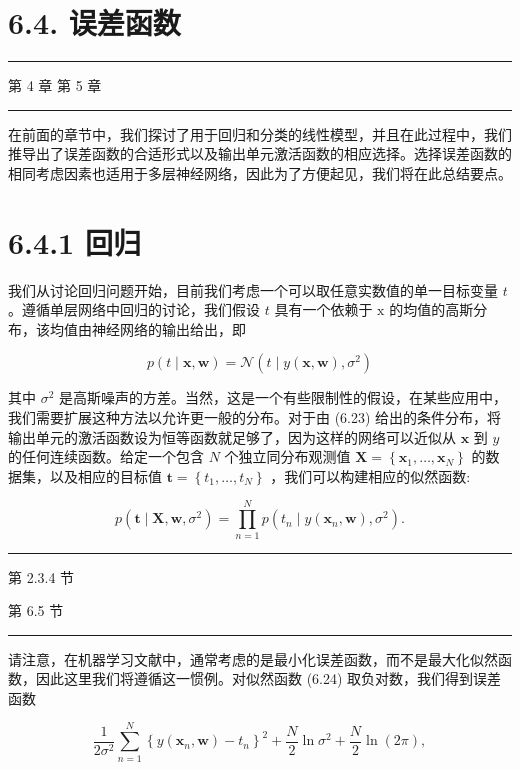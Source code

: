 \documentclass[10pt]{article}
\newcommand{\HRule}{\begin{center}\rule{0.9\linewidth}{0.2mm}\end{center}}
\begin{document}
\section*{6.4. 误差函数}

\HRule

第 4 章 第 5 章

\HRule

在前面的章节中，我们探讨了用于回归和分类的线性模型，并且在此过程中，我们推导出了误差函数的合适形式以及输出单元激活函数的相应选择。选择误差函数的相同考虑因素也适用于多层神经网络，因此为了方便起见，我们将在此总结要点。

\section*{6.4.1 回归}

我们从讨论回归问题开始，目前我们考虑一个可以取任意实数值的单一目标变量 \(t\) 。遵循单层网络中回归的讨论，我们假设 \(t\) 具有一个依赖于 \(\mathrm{x}\) 的均值的高斯分布，该均值由神经网络的输出给出，即

\[
p\left( {t \mid  \mathbf{x},\mathbf{w}}\right)  = \mathcal{N}\left( {t \mid  y\left( {\mathbf{x},\mathbf{w}}\right) ,{\sigma }^{2}}\right)  \tag{6.23}
\]

其中 \({\sigma }^{2}\) 是高斯噪声的方差。当然，这是一个有些限制性的假设，在某些应用中，我们需要扩展这种方法以允许更一般的分布。对于由 (6.23) 给出的条件分布，将输出单元的激活函数设为恒等函数就足够了，因为这样的网络可以近似从 \(\mathbf{x}\) 到 \(y\) 的任何连续函数。给定一个包含 \(N\) 个独立同分布观测值 \(\mathbf{X} = \left\{  {{\mathbf{x}}_{1},\ldots ,{\mathbf{x}}_{N}}\right\}\) 的数据集，以及相应的目标值 \(\mathbf{t} = \left\{  {{t}_{1},\ldots ,{t}_{N}}\right\}\) ，我们可以构建相应的似然函数:

\[
p\left( {\mathbf{t} \mid  \mathbf{X},\mathbf{w},{\sigma }^{2}}\right)  = \mathop{\prod }\limits_{{n = 1}}^{N}p\left( {{t}_{n} \mid  y\left( {{\mathbf{x}}_{n},\mathbf{w}}\right) ,{\sigma }^{2}}\right) . \tag{6.24}
\]

\HRule

第 2.3.4 节

第 6.5 节

\HRule

请注意，在机器学习文献中，通常考虑的是最小化误差函数，而不是最大化似然函数，因此这里我们将遵循这一惯例。对似然函数 (6.24) 取负对数，我们得到误差函数

\[
\frac{1}{2{\sigma }^{2}}\mathop{\sum }\limits_{{n = 1}}^{N}{\left\{  y\left( {\mathbf{x}}_{n},\mathbf{w}\right)  - {t}_{n}\right\}  }^{2} + \frac{N}{2}\ln {\sigma }^{2} + \frac{N}{2}\ln \left( {2\pi }\right) , \tag{6.25}
\]
\end{document}
